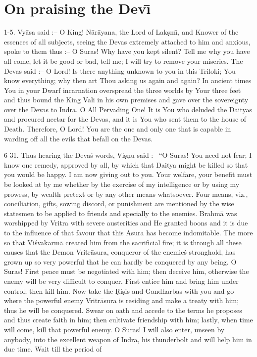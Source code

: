 \chapter{On praising the Dev\={\i}}

1-5. Vy\=asa said :-- O King! N\=ar\=ayana, the Lord of Lak\d{s}m\={\i}, and Knower of the essences of all subjects, seeing the Devas extremely attached to him and anxious, spoke to them thus :-- O Suras! Why have you kept silent? Tell me why you have all come, let it be good or bad, tell me; I will try to remove your miseries. The Devas said :-- O Lord! Is there anything unknown to you in this Triloki; You know everything; why then art Thou asking us again and again? In ancient times You in your Dwarf incarnation overspread the three worlds by Your three feet and thus bound the King Vali in his own premises and gave over the sovereignty over the Devas to Indra. O All Pervading One! It is You who deluded the Daityas and procured nectar for the Devas, and it is You who sent them to the house of Death. Therefore, O Lord! You are the one and only one that is capable in warding off all the evils that befall on the Devas.

6-31. Thus hearing the Deva\'s words, Vi\d{s}\d{n}u said :-- ``O Suras! You need not fear; I know one remedy, approved by all, by which that Daitya might be killed so that you would be happy. I am now giving out to you. Your welfare, your benefit must be looked at by me whether by the exercise of my intelligence or by using my prowess, by wealth pretext or by any other means whatsoever. Four means, viz., conciliation, gifts, sowing discord, or punishment are mentioned by the wise statesmen to be applied to friends and specially to the enemies. Brahm\=a was worshipped by Vritra with severe austerities and He granted boons and it is due to the influence of that favour that this Asura has become indomitable. The more so that Vi\'svakarm\=a created him from the sacrificial fire; it is through all these causes that the Demon Vritr\=asura, conqueror of the enemie\'s stronghold, has grown up so very powerful that he can hardly be conquered by any being. O Suras! First peace must be negotiated with him; then deceive him, otherwise the enemy will be very difficult to conquer. First entice him and bring him under control; then kill him. Now take the \d{R}i\d{s}is and Gandharbas with you and go where the powerful enemy Vritr\=asura is residing and make a treaty with him; thus he will be conquered. Swear on oath and accede to the terms he proposes and thus create faith in him; then cultivate friendship with him; lastly, when time will come, kill that powerful enemy. O Suras! I will also enter, unseen by anybody, into the excellent weapon of Indra, his thunderbolt and will help him in due time. Wait till the period of

